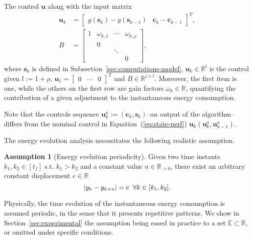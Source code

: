 \documentclass[letterpaper,10pt,conference]{ieeeconf}
\DeclarePairedDelimiter\abs{\lvert}{\rvert}%
\theoremstyle{definition}
\newtheorem{assm}[thm]{Assumption}
\begin{document}
The control $\mathbf{u}$ along with the input matrix
\begin{equation}\label{eq:state-control}\begin{split}  
  \mathbf{u}_k&=\begin{bmatrix}g(\mathbf{s}_k)-g(\mathbf{s}_{k-1}) & \mathbf{c}_k-\mathbf{c}_{k-1}\end{bmatrix}^T,\\
  B&=\left[\begin{array}{cccc}
    1& \omega_{k,1}& \cdots& \omega_{k,\rho}  \\
     &            0&       &  \\
     &             & \ddots&  \\
     &             &       & 0
  \end{array}\right],
\end{split}\end{equation}
where $\mathbf{s}_k$ is defined in Subsection~\ref{sec:computations-model}, $\mathbf{u}_k\in\mathbb{R}^l$ is the control given $l:=1+\rho$, $\mathbf{u}_{1}=\begin{bmatrix}0 & \cdots & 0\end{bmatrix}^T$ and $B\in\mathbb{R}^{j\times l}$. Moreover, the first item is one, while the others on the first row are gain factors $\omega_{k}\in\mathbb{R}$, quantifying the contribution of a given adjustment to the instantaneous energy consumption. 

Note that the controls sequence $\mathbf{u}_k^a:=(\mathbf{c}_{k},\mathbf{s}_{k})$--an output of the algorithm--differs from the nominal control in Equation~(\ref{eq:state-perf}) $\mathbf{u}_k(\mathbf{u}_k^a,\mathbf{u}_{k-1}^a)$. 

The energy evolution analysis necessitates the following realistic assumption.
\begin{assm}[Energy evelution periodicity]\label{assm:periodic} 
Given two time instants $k_1,k_2\in[t_f]$ s.t. $k_1>k_2$ and a constant value $n\in\mathbb{R}_{> 0}$, there exist an arbitrary constant displacement $e\in\mathbb{R}$
\begin{equation}
  \abs{y_{k}-y_{k+n}}= e\,\,\,\forall k\in[k_1,k_2].
\end{equation}
\end{assm}

Physically, the time evolution of the instantaneous energy consumption is assumed periodic, in the sense that it presents repetitive patterns. We show in Section~\ref{sec:experimental} the assumption being eased in practice to a set $\mathbb{E}\subset\mathbb{R}$, or omitted under specific conditions.
\end{document}

